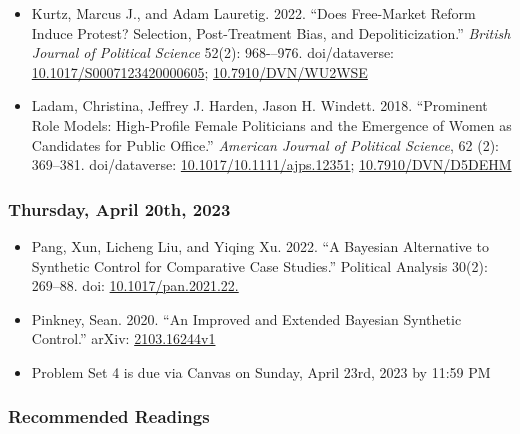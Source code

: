 \documentclass[12pt,]{article}
\begin{document}
\begin{itemize}
\item
  Kurtz, Marcus J., and Adam Lauretig. 2022. ``Does Free-Market Reform
  Induce Protest? Selection, Post-Treatment Bias, and
  Depoliticization.'' \emph{British Journal of Political Science} 52(2):
  968-\/--976. doi/dataverse:
  \href{https://doi.org/10.1017/S0007123420000605}{10.1017/S0007123420000605};
  \href{https://doi.org/10.7910/DVN/WU2WSE}{10.7910/DVN/WU2WSE}
\item
  Ladam, Christina, Jeffrey J. Harden, Jason H. Windett. 2018.
  ``Prominent Role Models: High-Profile Female Politicians and the
  Emergence of Women as Candidates for Public Office.'' \emph{American
  Journal of Political Science}, 62 (2): 369--381. doi/dataverse:
  \href{https://doi.org/10.1111/ajps.12351}{10.1017/10.1111/ajps.12351};
  \href{http://doi.org/10.7910/DVN/D5DEHM}{10.7910/DVN/D5DEHM}
\end{itemize}

\hypertarget{thursday-april-20th-2023}{%
\subsubsection{Thursday, April 20th,
2023}\label{thursday-april-20th-2023}}

\begin{itemize}
\item
  Pang, Xun, Licheng Liu, and Yiqing Xu. 2022. ``A Bayesian Alternative
  to Synthetic Control for Comparative Case Studies.'' Political
  Analysis 30(2): 269--88. doi:
  \href{https://doi.org/10.1017/pan.2021.22}{10.1017/pan.2021.22.}
\item
  Pinkney, Sean. 2020. ``An Improved and Extended Bayesian Synthetic
  Control.'' arXiv:
  \href{https://arxiv.org/abs/2103.16244}{2103.16244v1}
\item
  Problem Set 4 is due via Canvas on Sunday, April 23rd, 2023 by 11:59
  PM
\end{itemize}

\hypertarget{recommended-readings-10}{%
\subsubsection{Recommended Readings}\label{recommended-readings-10}}
\end{document}
